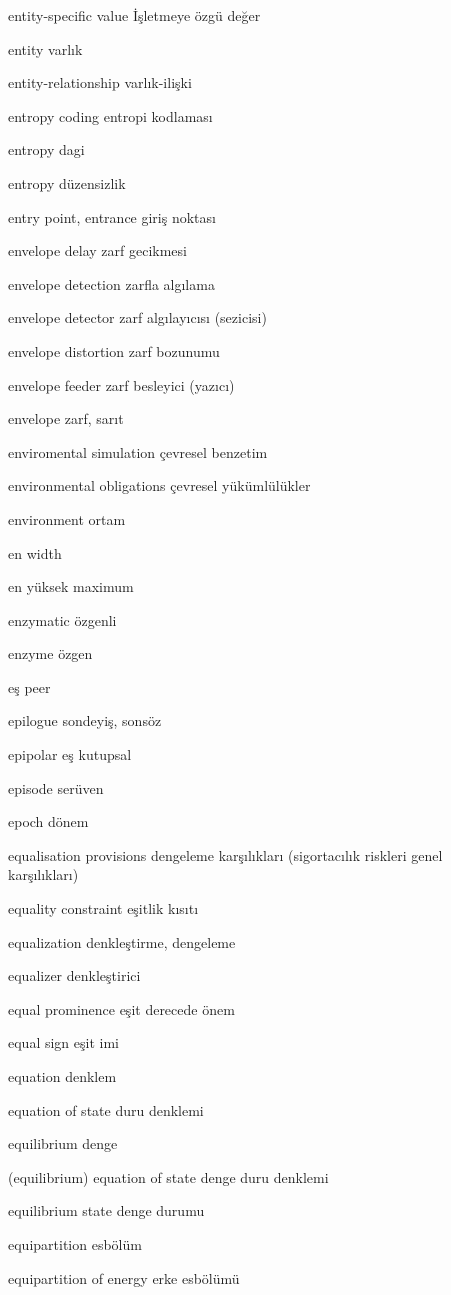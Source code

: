 \documentclass[12pt,fleqn]{article}\usepackage{../../common}
\begin{document}
entity-specific value İşletmeye özgü değer

entity varlık

entity-relationship varlık-ilişki

entropy coding entropi kodlaması

entropy dagi

entropy düzensizlik

entry point, entrance giriş noktası

envelope delay zarf gecikmesi

envelope detection zarfla algılama

envelope detector zarf algılayıcısı (sezicisi)

envelope distortion zarf bozunumu

envelope feeder zarf besleyici (yazıcı)

envelope zarf, sarıt

enviromental simulation çevresel benzetim

environmental obligations çevresel yükümlülükler

environment ortam

en width

en yüksek maximum

enzymatic özgenli

enzyme özgen

eş peer

epilogue sondeyiş, sonsöz

epipolar eş kutupsal

episode serüven

epoch dönem

equalisation provisions dengeleme karşılıkları (sigortacılık riskleri genel karşılıkları)

equality constraint eşitlik kısıtı

equalization denkleştirme, dengeleme

equalizer denkleştirici

equal prominence eşit derecede önem

equal sign eşit imi

equation denklem

equation of state duru denklemi

equilibrium denge

(equilibrium) equation of state denge duru denklemi

equilibrium state denge durumu

equipartition esbölüm

equipartition of energy erke esbölümü
\end{document}
